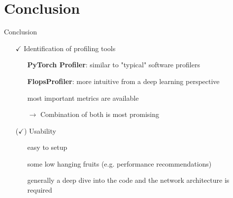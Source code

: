 \documentclass[compress,aspectratio=169]{beamer}
\begin{document}
\section{Conclusion}
\sectionIntro %

\begin{frame}{Conclusion}
\begin{itemize}
    \item[$\checkmark$] Identification of profiling tools
    \begin{itemize}
        \item[\textcolor{c3}{\textbullet}] \textbf{PyTorch Profiler}: similar to "typical" software profilers
        \item[\textcolor{c5}{\textbullet}] \textbf{FlopsProfiler}: more intuitive from a deep learning perspective
        \item[\textcolor{c5}{\textbullet}] most important metrics are available
        \item[$\rightarrow$] Combination of both is most promising
    \end{itemize}
    \vspace{1cm}
    \item[($\checkmark$)] Usability
    \begin{itemize}
        \item[\textcolor{c3}{\textbullet}] easy to setup
        \item[\textcolor{c3}{\textbullet}] some low hanging fruits (e.g. performance recommendations)
        \item[\textcolor{c1}{\textbullet}] generally a deep dive into the code and the network architecture is required
    \end{itemize}
\end{itemize}
\end{frame}
\end{document}
